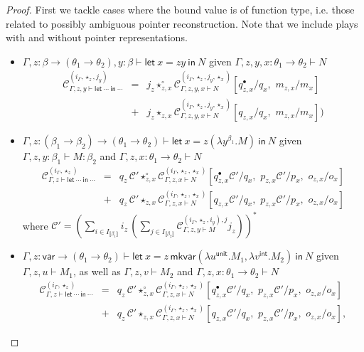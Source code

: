 \documentclass{CSML}
\theoremstyle{definition}\newtheorem{definition}[thm]{Definition}
\theoremstyle{definition}\newtheorem{example}[thm]{Example}
\theoremstyle{definition}\newtheorem{proposition}[thm]{Proposition}
\theoremstyle{definition}\newtheorem{lemma}[thm]{Lemma}
\theoremstyle{definition}\newtheorem{theorem}[thm]{Theorem}
\theoremstyle{definition}\newtheorem{corollary}[thm]{Corollary}
\theoremstyle{definition}\newtheorem{remark}[thm]{Remark}
\newcommand\clg[1]{\mathcal{#1}}
\newcommand\compi[2]{\mathcal{C}_{#1}^{#2}}
\newcommand\letin[2]{\mathsf{let}\ #1\ \mathsf{in}\ #2}
\newcommand\badvar[2]{\mathsf{mkvar}(#1,#2)}
\newcommand\comt{\mathsf{unit}}
\newcommand\expt{\mathsf{int}}
\newcommand\vart{\mathsf{var}}
\newcommand{\rarr}{\rightarrow}
\newcommand\sem[1]{\llbracket #1 \rrbracket}
\newcommand\seq[2]{{#1} \vdash {#2}}
\begin{document}
\begin{proof}
First we tackle cases where the bound value is of function type, i.e. those related to possibly ambiguous
pointer reconstruction. Note that we include plays with and without pointer representations.
\begin{itemize}
\item $\seq{\Gamma,z:\beta\rarr(\theta_1\rarr\theta_2), y:\beta}{\letin{x=z y}{N}}$
given $\seq{\Gamma,z, y, x:\theta_1\rarr\theta_2}{N}$
\[\begin{array}{rcl}
\compi{\seq{\Gamma,z,y}{\letin{\cdots}{\cdots}}}{(i_\Gamma,\star_z,j_y)} &=& 
j_z \star_{z,x}^\circ  \compi{\seq{\Gamma,z,y,x}{N}}{(i_\Gamma,\star_z,j_y,\star_x)}[q_{z,x}^\bullet/q_x,\,\, m_{z,x}/m_x]\\
&+& j_z \star_{z,x}  \compi{\seq{\Gamma,z,y,x}{N}}{(i_\Gamma,\star_z,j_y,\star_x)}[q_{z,x}/q_x,\,\, m_{z,x}/m_x])
\end{array}\]
\item $\seq{\Gamma,z:(\beta_1\rarr\beta_2)\rarr(\theta_1\rarr\theta_2)}{\letin{x=z(\lambda y^{\beta_1}.M)}{N}}$
given $\seq{\Gamma,z, y:\beta_1}{M:\beta_2}$ and $\seq{\Gamma,z,x:\theta_1\rarr\theta_2}{N}$
\[\begin{array}{rcl}
\compi{\seq{\Gamma,z}{\letin{\cdots}{\cdots}}}{(i_\Gamma,\star_z)} &=&
q_z\, \clg{C}' \star_{z,x}^\circ \compi{\seq{\Gamma,z,x}{N}}{(i_\Gamma,\star_z,\star_x)}[q_{z,x}^\bullet\clg{C}'/q_x,\,\, p_{z,x}\clg{C}'/p_x,\,\, o_{z,x}/o_x]\\
&+& q_z\, \clg{C}' \star_{z,x} \compi{\seq{\Gamma,z,x}{N}}{(i_\Gamma,\star_z,\star_x)}[q_{z,x}\clg{C}'/q_x,\,\, p_{z,x}\clg{C}'/p_x,\,\, o_{z,x}/o_x]
\end{array}
\]
where $\clg{C}'=(\sum_{i\in I_{\sem{\beta_1}}} i_z\, (\sum_{j\in I_{\sem{\beta_2}}}\compi{\seq{\Gamma,z,y}{M}}{(i_\Gamma,\star_z,i_y),j} j_z) )^\ast$ 
\item $\seq{\Gamma,z:\vart\rarr(\theta_1\rarr\theta_2)}{\letin{x=z\,\badvar{\lambda u^{\comt}.M_1}{\lambda v^\expt.M_2}}{N}}$
given $\seq{\Gamma,z, u}{M_1}$, as well as $\seq{\Gamma,z, v}{M_2}$ and $\seq{\Gamma,z,x:\theta_1\rarr\theta_2}{N}$
\[\begin{array}{rcl}
\compi{\seq{\Gamma,z}{\letin{\cdots}{\cdots}}}{(i_\Gamma,\star_z)} &=& 
q_z\, \clg{C}' \star_{z,x}^\circ  \compi{\seq{\Gamma,z,x}{N}}{(i_\Gamma,\star_z,\star_x)}[q_{z,x}^\bullet\clg{C}'/q_x,\,\, p_{z,x}\clg{C}'/p_x,\,\, o_{z,x}/o_x] \\
&+& 
q_z\, \clg{C}' \star_{z,x}  \compi{\seq{\Gamma,z,x}{N}}{(i_\Gamma,\star_z,\star_x)}[q_{z,x}\clg{C}'/q_x,\,\, p_{z,x}\clg{C}'/p_x,\,\, o_{z,x}/o_x],

\end{array}\]
\end{itemize}
\end{proof}
\end{document}
